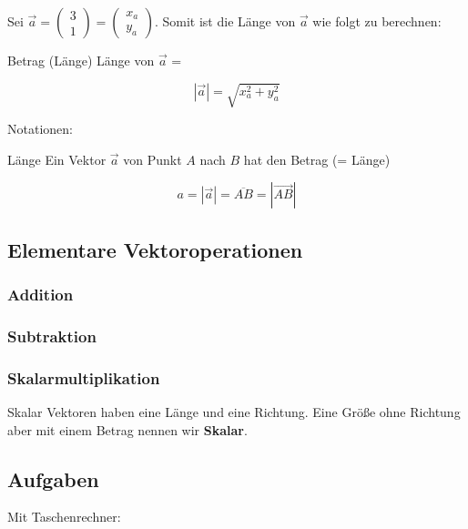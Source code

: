 Sei $\vec{a} = \begin{pmatrix} 3\\ 1\end{pmatrix}
  = \begin{pmatrix}x_a\\y_a\end{pmatrix}$. Somit ist die Länge von
    $\vec{a}$ wie folgt zu berechnen:

    \begin{gesetz}{Betrag (Länge)}{}
      Länge von $\vec{a}$ =

      $$|\vec{a}| = \sqrt{x_a^2 + y_a^2}$$
      \end{gesetz}
    Notationen:

    \begin{definition}{Länge}{}
      Ein Vektor $\vec{a}$ von Punkt $A$ nach $B$ hat den Betrag (= Länge)

      $$a = |\vec{a}| = \overline{AB} = \left|\overrightarrow{AB}\right|$$
    \end{definition}

\newpage
    
\subsection{Elementare Vektoroperationen}

\subsubsection{Addition}

\subsubsection{Subtraktion}
\newpage

\subsubsection{Skalarmultiplikation}
\begin{definition}{Skalar}{}
  Vektoren haben eine Länge und eine Richtung. Eine Größe ohne
  Richtung aber mit einem Betrag nennen wir \textbf{Skalar}. 
\end{definition}
\newpage


\subsection*{Aufgaben}

Mit Taschenrechner:

\newpage
